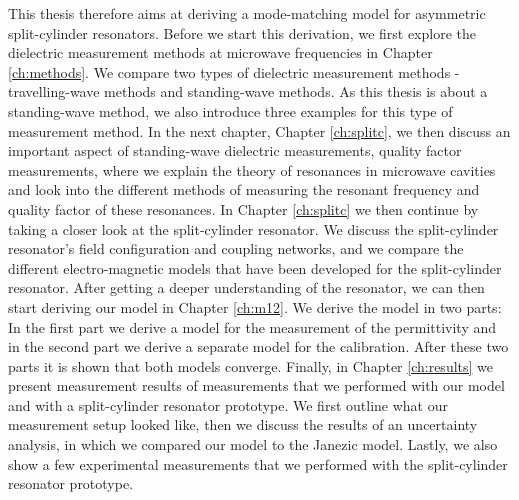 This thesis therefore aims at deriving a mode-matching model for asymmetric split-cylinder resonators. Before we start this derivation, we first explore the dielectric measurement methods at microwave frequencies in Chapter \ref{ch:methods}. We compare two types of dielectric measurement methods - travelling-wave methods and standing-wave methods. As this thesis is about a standing-wave method, we also introduce three examples for this type of measurement method. In the next chapter, Chapter \ref{ch:splitc}, we then discuss an important aspect of standing-wave dielectric measurements, quality factor measurements, where we explain the theory of resonances in microwave cavities and look into the different methods of measuring the resonant frequency and quality factor of these resonances. In Chapter \ref{ch:splitc} we then continue by taking a closer look at the split-cylinder resonator. We discuss the split-cylinder resonator's field configuration and coupling networks, and we compare the different electro-magnetic models that have been developed for the split-cylinder resonator. After getting a deeper understanding of the resonator, we can then start deriving our model in Chapter \ref{ch:m12}. We derive the model in two parts: In the first part we derive a model for the measurement of the permittivity and in the second part we derive a separate model for the calibration. After these two parts it is shown that both models converge. Finally, in Chapter \ref{ch:results} we present measurement results of measurements that we performed with our model and with a split-cylinder resonator prototype. We first outline what our measurement setup looked like, then we discuss the results of an uncertainty analysis, in which we compared our model to the Janezic model. Lastly, we also show a few experimental measurements that we performed with the split-cylinder resonator prototype.
